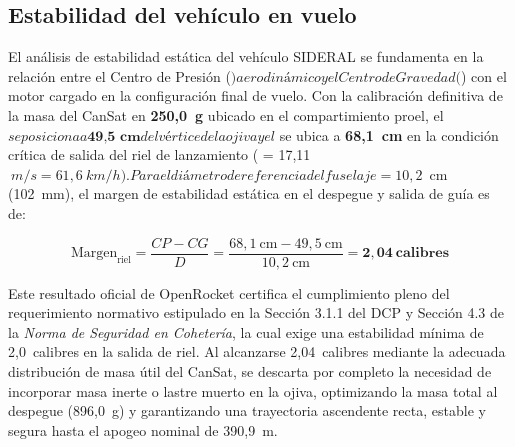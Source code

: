 
\subsection{Estabilidad del vehículo en vuelo}
El análisis de estabilidad estática del vehículo SIDERAL se fundamenta en la relación entre el Centro de Presión ($) aerodinámico y el Centro de Gravedad ($) con el motor cargado en la configuración final de vuelo. Con la calibración definitiva de la masa del CanSat en \textbf{250,0~g} ubicado en el compartimiento proel, el $ se posiciona a \textbf{49,5~cm} del vértice de la ojiva y el $ se ubica a \textbf{68,1~cm} en la condición crítica de salida del riel de lanzamiento ({} = 17,11$~m/s = 61,6~km/h).

Para el diámetro de referencia del fuselaje  = 10,2$~cm (102~mm), el margen de estabilidad estática en el despegue y salida de guía es de:

\begin{equation}
\text{Margen}_{\text{riel}} = \frac{CP - CG}{D} = \frac{68,1~\text{cm} - 49,5~\text{cm}}{10,2~\text{cm}} = \mathbf{2,04~\text{calibres}}
\end{equation}

Este resultado oficial de OpenRocket certifica el cumplimiento pleno del requerimiento normativo estipulado en la Sección 3.1.1 del DCP y Sección 4.3 de la \textit{Norma de Seguridad en Cohetería}, la cual exige una estabilidad mínima de 2,0~calibres en la salida de riel. Al alcanzarse 2,04~calibres mediante la adecuada distribución de masa útil del CanSat, se descarta por completo la necesidad de incorporar masa inerte o lastre muerto en la ojiva, optimizando la masa total al despegue (896,0~g) y garantizando una trayectoria ascendente recta, estable y segura hasta el apogeo nominal de 390,9~m.

